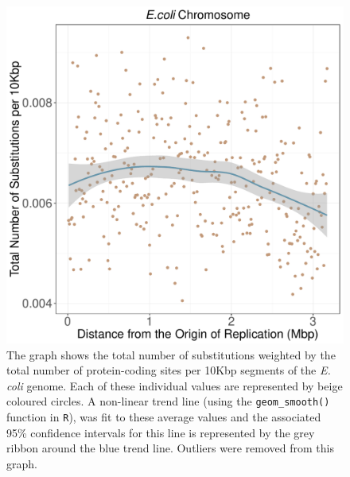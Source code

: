 \documentclass[11pt]{article}
\newcommand{\ecol}{\textit{E.\,coli}\xspace}
\begin{document}
\begin{figure}[h]
	\begin{center}
		\includegraphics[width=\textwidth]{./figs/ecoli_10KB_weighted_subs_nonpar_23Sep20.pdf}
		\caption{\label{fig:ecoli_nonpar}The graph shows the total number of substitutions weighted by the total number of protein-coding sites per 10Kbp segments of the \ecol genome. Each of these individual values are represented by beige coloured circles. A non-linear trend line (using the \texttt{geom\_smooth()} function in \texttt{R}), was fit to these average values and the associated 95\% confidence intervals for this line is represented by the grey ribbon around the blue trend line. Outliers were removed from this graph.}
	\end{center}
\end{figure}
\end{document}
